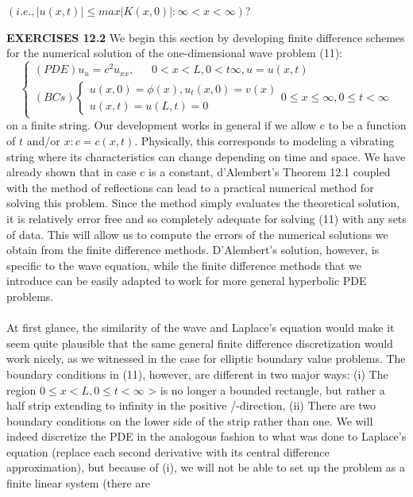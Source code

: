 \documentclass[../main.tex]{subfiles}
\begin{document}
{{\begin{enumerate}
$(i.e., \vert u(x,t)\vert \leqslant max{\vert K(x,0) \vert: \infty < x < \infty} )$?
\end{enumerate}
\textbf{EXERCISES 12.2}
We begin this section by developing finite difference schemes for the numerical 
solution of the one-dimensional wave problem (11):
$$\begin{cases} 
	(PDE) u_u=c^2u_{xx}, ~~~~~~~ 
	0< x< L, 0<t \infty , u=u(x,t) \\ 
	(BCs)
	\begin{cases} 
	u(x,0)=\phi (x), u_t(x,0)=v(x)\\
	u(x,t)=u(L,t)=0
	\end{cases}
	0 \leqslant x \leqslant\infty, 0\leqslant t< \infty 
\end{cases}$$
on a finite string. Our development works in general if we allow c to be a function 
of $t$ and/or $x: c = c(x,t)$. Physically, this corresponds to modeling a vibrating string 
where its characteristics can change depending on time and space. We have 
already shown that in case c is a constant, d'Alembert's Theorem 12.1 coupled 
with the method of reflections can lead to a practical numerical method for solving 
this problem. Since the method simply evaluates the theoretical solution, it is 
relatively error free and so completely adequate for solving (11) with any sets of 
data. This will allow us to compute the errors of the numerical solutions we obtain 
from the finite difference methods. D'Alembert's solution, however, is specific to 
the wave equation, while the finite difference methods that we introduce can be 
easily adapted to work for more general hyperbolic PDE problems. 
\\
\\
At first glance, the similarity of the wave and Laplace's equation would make it 
seem quite plausible that the same general finite difference discretization would 
work nicely, as we witnessed in the case for elliptic boundary value problems. 
The boundary conditions in (11), however, are different in two major ways: (i) 
The region  
$0 \leqslant x < L, 0 \leqslant t < \infty$
> is no longer a bounded rectangle, but rather a half 
strip extending to infinity in the positive /-direction, (ii) There are two boundary 
conditions on the lower side of the strip rather than one. We will indeed discretize 
the PDE in the analogous fashion to what was done to Laplace's equation (replace 
each second derivative with its central difference approximation), but because of 
(i), we will not be able to set up the problem as a finite linear system (there are 
}}
\end{document}
